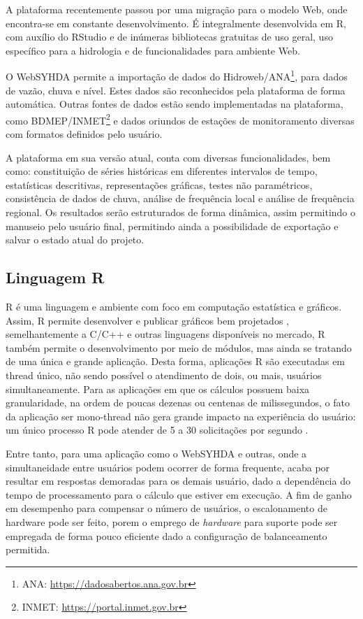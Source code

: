 \documentclass[12pt,english,brazil]{article}
\begin{document}
A plataforma recentemente passou por uma migração para o modelo Web, onde encontra-se em constante desenvolvimento. É integralmente desenvolvida em R, com auxílio do RStudio e de inúmeras bibliotecas gratuitas de uso geral, uso específico para a hidrologia e de funcionalidades para ambiente Web. %

O WebSYHDA permite a importação de dados do Hidroweb/ANA\footnote{ANA: \url{https://dadosabertos.ana.gov.br}}, para dados de vazão, chuva e nível. Estes dados são reconhecidos pela plataforma de forma automática. Outras fontes de dados estão sendo implementadas na plataforma, como BDMEP/INMET\footnote{INMET: \url{https://portal.inmet.gov.br}} e dados oriundos de estações de monitoramento diversas com formatos definidos pelo usuário.

A plataforma em sua versão atual, conta com diversas funcionalidades, bem como: constituição de séries históricas em diferentes intervalos de tempo, estatísticas descritivas, representações gráficas, testes não paramétricos, consistência de dados de chuva, análise de frequência local e análise de frequência regional. Os resultados serão estruturados de forma dinâmica, assim permitindo o manuseio pelo usuário final, permitindo ainda a possibilidade de exportação e salvar o estado atual do projeto. 

\subsection{Linguagem R} \label{sec:R}

R é uma linguagem e ambiente com foco em computação estatística e gráficos. Assim, R permite desenvolver e publicar gráficos bem projetados \cite{whatR}, semelhantemente a C/C++ e outras linguagens disponíveis no mercado, R também permite o desenvolvimento por meio de módulos, mas ainda se tratando de uma única e grande aplicação. Desta forma, aplicações R são executadas em thread único, não sendo possível o atendimento de dois, ou mais, usuários simultaneamente. Para as aplicações em que os cálculos possuem baixa granularidade, na ordem de poucas dezenas ou centenas de milissegundos, o fato da aplicação ser mono-thread não gera grande impacto na experiência do usuário: um único processo R  pode atender de 5 a 30 solicitações por segundo \cite{ShinyappsEscalabilidade}. 

Entre tanto, para uma aplicação como o WebSYHDA e outras, onde a simultaneidade entre usuários podem ocorrer de forma frequente, acaba por resultar em respostas demoradas para os demais usuário, dado a dependência do tempo de processamento para o cálculo que estiver em execução. A fim de ganho em desempenho para compensar o número de usuários, o escalonamento de hardware pode ser feito, porem o emprego de \emph{hardware} para suporte pode ser empregada de forma pouco eficiente dado a configuração de balanceamento permitida. %
\end{document}
